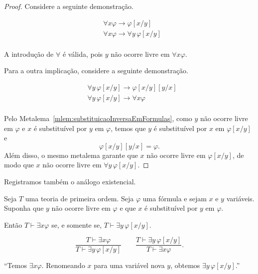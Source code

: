 \begin{proof}
    Considere a seguinte demonstração.

    \begin{align*}
        &\forall x\varphi\rightarrow \varphi[x/y] \tag{FO14}\\
        &\forall x\varphi\rightarrow \forall y\,\varphi[x/y] \tag{Introdução de $\forall$}\\
    \end{align*}

    A introdução de $\forall$ é válida, pois $y$ não ocorre livre em $\forall x\varphi$.

    Para a outra implicação, considere a seguinte demonstração.

    \begin{align*}
        &\forall y\,\varphi[x/y]\rightarrow \varphi[x/y][y/x] \tag{FO14}\\
        &\forall y\,\varphi[x/y]\rightarrow \forall x\varphi \tag{Introdução de $\forall$}\\
    \end{align*}

    Pelo Metalema~\ref{mlem:substituicaoInversaEmFormulas}, como $y$ não ocorre livre em $\varphi$ e $x$ é substituível por $y$ em $\varphi$, temos que $y$ é substituível por $x$ em $\varphi[x/y]$ e
    \[
        \varphi[x/y][y/x]=\varphi.
    \]
    Além disso, o mesmo metalema garante que $x$ não ocorre livre em $\varphi[x/y]$, de modo que $x$ não ocorre livre em $\forall y\,\varphi[x/y]$.
\end{proof}

Registramos também o análogo existencial.

\begin{metalemma}\label{mlem:renomeacaoVariavelExistencial}
    Seja $T$ uma teoria de primeira ordem.
    Seja $\varphi$ uma fórmula e sejam $x$ e $y$ variáveis.
    Suponha que $y$ não ocorre livre em $\varphi$ e que $x$ é substituível por $y$ em $\varphi$.

    Então $T\vdash \exists x\varphi$ se, e somente se, $T\vdash \exists y\,\varphi[x/y]$.

    \[
        \frac{T\vdash \exists x\varphi}
             {T\vdash \exists y\,\varphi[x/y]}
        \qquad
        \frac{T\vdash \exists y\,\varphi[x/y]}
             {T\vdash \exists x\varphi}.
    \]

    ``Temos $\exists x\varphi$.
    Renomeando $x$ para uma variável nova $y$, obtemos $\exists y\,\varphi[x/y]$.''
\end{metalemma}

